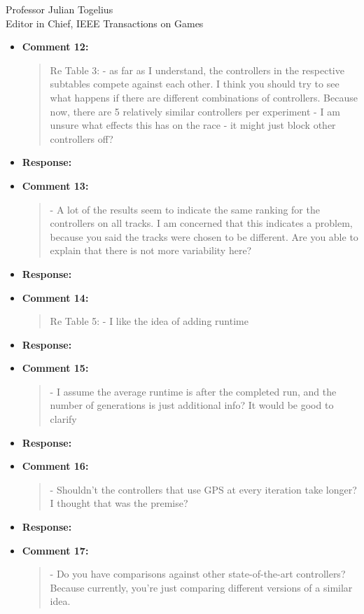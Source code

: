 \documentclass[10pt]{letter} %
\begin{document}
\begin{letter}{Professor Julian Togelius \\ Editor in Chief, IEEE Transactions on Games}
\begin{enumerate}
\begin{itemize}
			\item {\bf Comment 12:}
				\begin{quote}	
					Re Table 3:
					- as far as I understand, the controllers in the respective subtables compete against each other. I think you should try to see what happens if there are different combinations of controllers. Because now, there are 5 relatively similar controllers per experiment - I am unsure what effects this has on the race - it might just block other controllers off?
				\end{quote}	
			\item {\bf Response:} 
			\item {\bf Comment 13:}
				\begin{quote}	
					- A lot of the results seem to indicate the same ranking for the controllers on all tracks. I am concerned that this indicates a problem, because you said the tracks were chosen to be different. Are you able to explain that there is not more variability here?
				\end{quote}	
			\item {\bf Response:} 
			\item {\bf Comment 14:}
				\begin{quote}	
					Re Table 5:
					- I like the idea of adding runtime
				\end{quote}	
			\item {\bf Response:} 
			\item {\bf Comment 15:}
				\begin{quote}	
					- I assume the average runtime is after the completed run, and the number of generations is just additional info? It would be good to clarify
				\end{quote}	
			\item {\bf Response:} 
			\item {\bf Comment 16:}
				\begin{quote}	
				- Shouldn't the controllers that use GPS at every iteration take longer? I thought that was the premise?
				\end{quote}	
			\item {\bf Response:} 
			\item {\bf Comment 17:}
				\begin{quote}	
					- Do you have comparisons against other state-of-the-art controllers? Because currently, you're just comparing different versions of a similar idea.
				\end{quote}	


\end{itemize}
\end{enumerate}
\end{letter}
\end{document}
